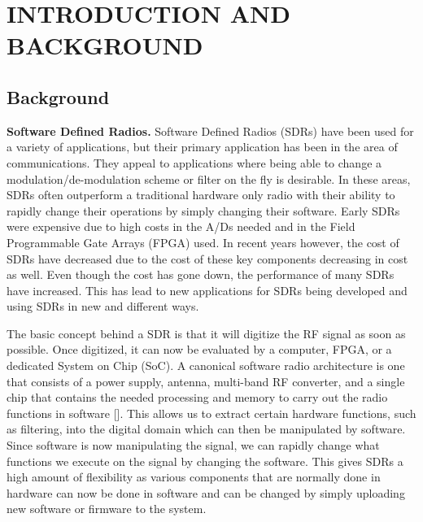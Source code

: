 \chapter{INTRODUCTION AND  BACKGROUND}



\section{Background}
\textbf{Software Defined Radios.} Software Defined Radios (SDRs) have been used for a variety of applications, but their primary application has been in the area of communications.  They appeal to applications where being able to change a modulation/de-modulation scheme or filter on the fly is desirable.  In these areas, SDRs often outperform a traditional hardware only radio with their ability to rapidly change their operations by simply changing their software.  Early SDRs were expensive due to high costs in the A/Ds needed and in the Field Programmable Gate Arrays (FPGA) used.  In recent years however, the cost of SDRs have decreased due to the cost of these key components decreasing in cost as well.  Even though the cost has gone down, the performance of many SDRs have increased.  This has lead to new applications for SDRs being developed and using SDRs in new and different ways.

The basic concept behind a SDR is that it will digitize the RF signal as soon as possible.  Once digitized, it can now be evaluated by a computer, FPGA, or a dedicated System on Chip (SoC).  A canonical software radio architecture is one that consists of a power supply, antenna, multi-band RF converter, and a single chip that contains the needed processing and memory to carry out the radio functions in software [\cite{Mitola1995}].  This allows us to extract certain hardware functions, such as filtering, into the digital domain which can then be manipulated by software.  Since software is now manipulating the signal, we can rapidly change what functions we execute on the signal by changing the software.  This gives SDRs a high amount of flexibility as various components that are normally done in hardware can now be done in software and can be changed by simply uploading new software or firmware to the system.  

